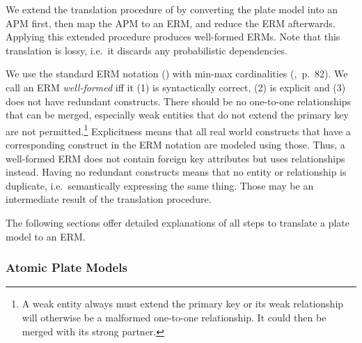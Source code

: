 
We extend the translation procedure of \textcite{heckerman2007probabilistic} by converting the plate model into an APM first, then map the APM to an ERM, and reduce the ERM afterwards. Applying this extended procedure produces well-formed ERMs. Note that this translation is lossy, i.e.~it discards any probabilistic dependencies.

We use the standard ERM notation (\cite{chen1976entity}) with min-max cardinalities (\cite{elmasri2007database},~p.~82). We call an ERM \emph{well-formed} iff it (1) is syntactically correct, (2) is explicit and (3) does not have redundant constructs. There should be no one-to-one relationships that can be merged, especially weak entities that do not extend the primary key are not permitted.\footnote{A weak entity always must extend the primary key or its weak relationship will otherwise be a malformed one-to-one relationship. It could then be merged with its strong partner.} Explicitness means that all real world constructs that have a corresponding construct in the ERM notation are modeled using those. Thus, a well-formed ERM does not contain foreign key attributes but uses relationships instead. Having no redundant constructs means that no entity or relationship is duplicate, i.e.~semantically expressing the same thing. Those may be an intermediate result of the translation procedure.

The following sections offer detailed explanations of all steps to translate a plate model to an ERM.

\subsubsection{Atomic Plate Models}

